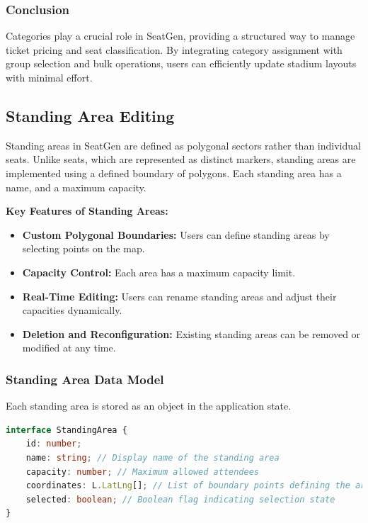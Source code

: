 \subsubsection{Conclusion}
Categories play a crucial role in SeatGen, providing a structured way to manage ticket pricing and seat classification. By integrating category assignment with group selection and bulk operations, users can efficiently update stadium layouts with minimal effort.

\subsection{Standing Area Editing}
Standing areas in SeatGen are defined as polygonal sectors rather than individual seats. Unlike seats, which are represented as distinct markers, standing areas are implemented using a defined boundary of polygons. Each standing area has a name, and a maximum capacity.

\textbf{Key Features of Standing Areas:}
\begin{itemize}
    \item \textbf{Custom Polygonal Boundaries:} Users can define standing areas by selecting points on the map.
    \item \textbf{Capacity Control:} Each area has a maximum capacity limit.
    \item \textbf{Real-Time Editing:} Users can rename standing areas and adjust their capacities dynamically.
    \item \textbf{Deletion and Reconfiguration:} Existing standing areas can be removed or modified at any time.
\end{itemize}

\subsubsection{Standing Area Data Model}
Each standing area is stored as an object in the application state.

\begin{lstlisting}[language=TypeScript, caption=Standing Area Data Model, label=lst:standingarea-model]
interface StandingArea {
    id: number;
    name: string; // Display name of the standing area
    capacity: number; // Maximum allowed attendees
    coordinates: L.LatLng[]; // List of boundary points defining the area
    selected: boolean; // Boolean flag indicating selection state
}
\end{lstlisting}


